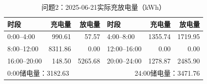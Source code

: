 \begin{table}[H]\centering\small
\caption{问题2：2025-06-21实际充放电量（kWh）}
\label{tab:q2_0621_storage}
\begin{tabular}{lrrlrr}\toprule
时段 & 充电量 & 放电量 & 时段 & 充电量 & 放电量\\\midrule
0:00--4:00 & 990.61 & 57.57 & 4:00--8:00 & 1355.74 & 1719.95 \\
8:00--12:00 & 8311.86 & 0.00 & 12:00--16:00 & 0.00 & 0.00 \\
16:00--20:00 & 148.50 & 5265.68 & 20:00--24:00 & 1278.87 & 2485.90 \\
\midrule\multicolumn{3}{l}{0:00储电量：3182.63} & \multicolumn{3}{r}{24:00储电量：3471.76}\\
\bottomrule\end{tabular}\end{table}
